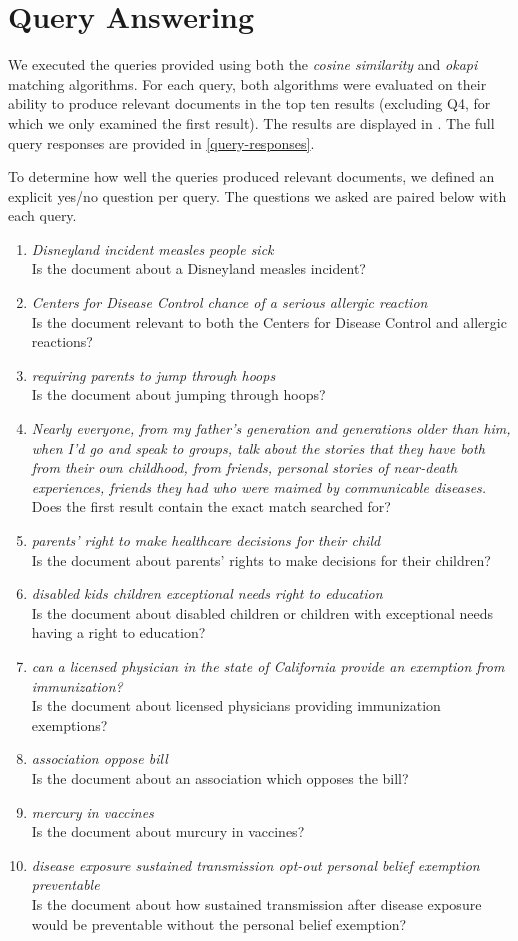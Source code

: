 \documentclass{report}
\newcommand{\query}[2]{\item\textit{#1}\\#2}
\newcommand{\okapi}{\textit{okapi} }
\newcommand{\cosine}{\textit{cosine similarity} }
\begin{document}
\section{Query Answering}
We executed the queries provided using both the \cosine and \okapi
matching algorithms. For each query, both algorithms were evaluated on
their ability to produce relevant documents in the top ten results
(excluding Q4, for which we only examined the first result). The
results are displayed in . The full query
responses are provided in \vref{query-responses}.

To determine how well the queries produced relevant documents, we
defined an explicit yes/no question per query. The questions we asked
are paired below with each query.

\begin{enumerate}[Q1:]
  \query{Disneyland incident measles people sick}{Is the document
about a Disneyland measles incident?}

  \query{Centers for Disease Control chance of a serious allergic
reaction}{Is the document relevant to both the Centers for Disease
Control and allergic reactions?}

  \query{requiring parents to jump through hoops}{Is the document
about jumping through hoops?}

  \query{Nearly everyone, from my father's generation and generations
older than him, when I'd go and speak to groups, talk about the
stories that they have both from their own childhood, from friends,
personal stories of near-death experiences, friends they had who were
maimed by communicable diseases.}{Does the first result contain the
exact match searched for?}

  \query{parents' right to make healthcare decisions for their
child}{Is the document about parents' rights to make decisions for
their children?}

  \query{disabled kids children exceptional needs right to
education}{Is the document about disabled children or children with
exceptional needs having a right to education?}

  \query{can a licensed physician in the state of California provide
an exemption from immunization?}{Is the document about licensed
physicians providing immunization exemptions?}

  \query{association oppose bill}{Is the document about an association
which opposes the bill?}

  \query{mercury in vaccines}{Is the document about murcury in
vaccines?}

  \query{disease exposure sustained transmission opt-out personal
belief exemption preventable}{Is the document about how sustained transmission after disease exposure would be preventable without the personal belief exemption?}
\end{enumerate}
\end{document}
